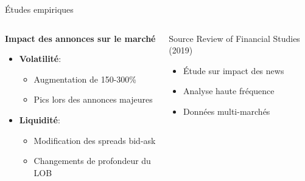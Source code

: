 \documentclass[aspectratio=169]{beamer}  %
\begin{document}
\begin{frame}{Études empiriques}
    \begin{columns}
        \begin{column}{0.6\textwidth}
            \textbf{Impact des annonces sur le marché}
            \begin{itemize}
                \item \textbf{Volatilité}:
                \begin{itemize}
                    \item Augmentation de 150-300\%
                    \item Pics lors des annonces majeures
                \end{itemize}
                \item \textbf{Liquidité}:
                \begin{itemize}
                    \item Modification des spreads bid-ask
                    \item Changements de profondeur du LOB
                \end{itemize}
            \end{itemize}
        \end{column}
        \begin{column}{0.4\textwidth}
            \begin{alertblock}{Source}
                \small{Review of Financial Studies (2019)}
                \begin{itemize}
                    \item Étude sur impact des news
                    \item Analyse haute fréquence
                    \item Données multi-marchés
                \end{itemize}
            \end{alertblock}
        \end{column}
    \end{columns}
\end{frame}
\end{document}
